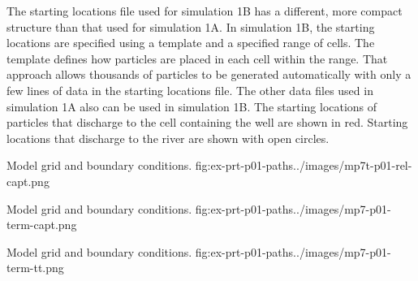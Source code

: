 The starting locations file used for simulation 1B has a different, more compact structure than that used for simulation 1A. In simulation 1B, the starting locations are specified using a template and a specified range of cells. The template defines how particles are placed in each cell within the range. That approach allows thousands of particles to be generated automatically with only a few lines of data in the starting locations file. The other data files used in simulation 1A also can be used in simulation 1B. The starting locations of particles that discharge to the cell containing the well are shown in red. Starting locations that discharge to the river are shown with open circles.

\begin{StandardFigure}{
    Model grid and boundary conditions.
    }{fig:ex-prt-p01-paths}{../images/mp7t-p01-rel-capt.png}
\end{StandardFigure}

\begin{StandardFigure}{
    Model grid and boundary conditions.
    }{fig:ex-prt-p01-paths}{../images/mp7-p01-term-capt.png}
\end{StandardFigure}

\begin{StandardFigure}{
    Model grid and boundary conditions.
    }{fig:ex-prt-p01-paths}{../images/mp7-p01-term-tt.png}
\end{StandardFigure}